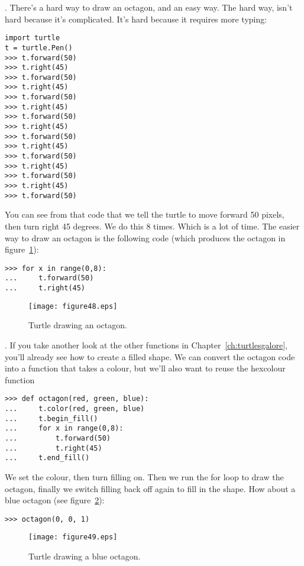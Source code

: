 . There's a hard way to draw an octagon, and an easy way.  The hard way, isn't hard because it's complicated.  It's hard because it requires more typing:

\begin{listing}
\begin{verbatim}
import turtle
t = turtle.Pen()
>>> t.forward(50)
>>> t.right(45)
>>> t.forward(50)
>>> t.right(45)
>>> t.forward(50)
>>> t.right(45)
>>> t.forward(50)
>>> t.right(45)
>>> t.forward(50)
>>> t.right(45)
>>> t.forward(50)
>>> t.right(45)
>>> t.forward(50)
>>> t.right(45)
>>> t.forward(50)
\end{verbatim}
\end{listing}

\noindent
You can see from that code that we tell the turtle to move forward 50 pixels, then turn right 45 degrees.  We do this 8 times.  Which is a lot of time.  The easier way to draw an octagon is the following code (which produces the octagon in figure~\ref{fig48}):

\begin{listing}
\begin{verbatim}
>>> for x in range(0,8):
...     t.forward(50)
...     t.right(45)
\end{verbatim}
\end{listing}

\begin{figure}
\begin{center}
\texttt{[image: figure48.eps]}
\end{center}
\caption{Turtle drawing an octagon.}\label{fig48}
\end{figure}

.  If you take another look at the other functions in Chapter~\ref{ch:turtlesgalore}, you'll already see how to create a filled shape. We can convert the octagon code into a function that takes a colour, but we'll also want to reuse the hexcolour function 

\begin{listing}
\begin{verbatim}
>>> def octagon(red, green, blue):
...     t.color(red, green, blue)
...     t.begin_fill()
...     for x in range(0,8):
...         t.forward(50)
...         t.right(45)
...     t.end_fill()
\end{verbatim}
\end{listing}

We set the colour, then turn filling on.  Then we run the for loop to draw the octagon, finally we switch filling back off again to fill in the shape. How about a blue octagon (see figure~\ref{fig49}):

\begin{listing}
\begin{verbatim}
>>> octagon(0, 0, 1)
\end{verbatim}
\end{listing}

\begin{figure}
\begin{center}
\texttt{[image: figure49.eps]}
\end{center}
\caption{Turtle drawing a blue octagon.}\label{fig49}
\end{figure}
\newpage
